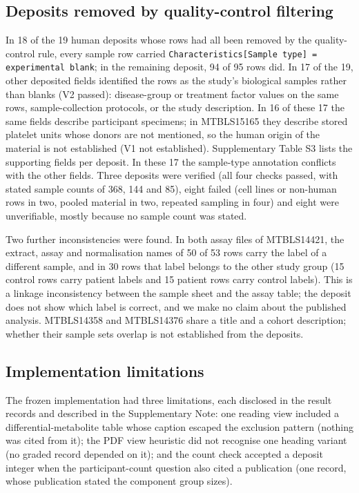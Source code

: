 \subsection{Deposits removed by quality-control filtering}\label{sec:res-a35}

In 18 of the 19 human deposits whose rows had all been removed by the quality-control rule, every sample row carried
\texttt{Characteristics[Sample type] = experimental blank}; in the remaining deposit, 94 of 95 rows did. In 17 of the
19, other deposited fields identified the rows as the study's biological samples rather than blanks (V2 passed):
disease-group or treatment factor values on the same rows, sample-collection protocols, or the study description. In 16
of these 17 the same fields describe participant specimens; in MTBLS15165 they describe stored platelet units whose
donors are not mentioned, so the human origin of the material is not established (V1 not established). Supplementary Table S3 lists the supporting fields per deposit. In these 17 the sample-type annotation
conflicts with the other fields. Three deposits were verified (all four checks passed, with stated sample counts of
368, 144 and 85), eight failed (cell lines or non-human rows in two, pooled material in two, repeated sampling in
four) and eight were unverifiable, mostly because no sample count was stated.

Two further inconsistencies were found. In both assay files of MTBLS14421, the extract, assay and normalisation names
of 50 of 53 rows carry the label of a different sample, and in 30 rows that label belongs to the other study group
(15 control rows carry patient labels and 15 patient rows carry control labels). This is a linkage inconsistency
between the sample sheet and the assay table; the deposit does not show which label is correct, and we make no claim
about the published analysis. MTBLS14358 and MTBLS14376 share a title and a cohort description; whether their sample
sets overlap is not established from the deposits.




\subsection{Implementation limitations}\label{sec:res-limits}

The frozen implementation had three limitations, each disclosed in the result records and described in the
Supplementary Note: one reading view included a differential-metabolite table whose caption escaped the exclusion
pattern (nothing was cited from it); the PDF view heuristic did not recognise one heading variant (no graded record
depended on it); and the count check accepted a deposit integer when the participant-count question also cited a
publication (one record, whose publication stated the component group sizes).